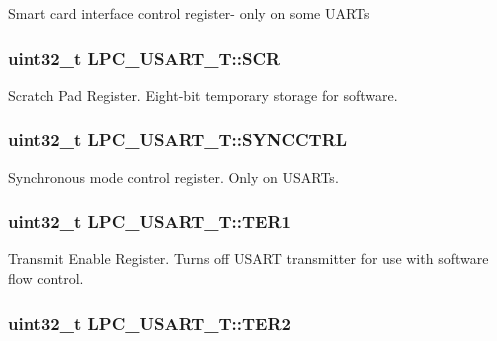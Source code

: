 Smart card interface control register-\/ only on some U\-A\-R\-Ts \hypertarget{structLPC__USART__T_a28417e4b3d19fcbb6c6ef116376ed58b}{
\subsubsection[{S\-C\-R}]{ uint32\-\_\-t L\-P\-C\-\_\-\-U\-S\-A\-R\-T\-\_\-\-T\-::\-S\-C\-R}}\label{structLPC__USART__T_a28417e4b3d19fcbb6c6ef116376ed58b}
Scratch Pad Register. Eight-\/bit temporary storage for software. \hypertarget{structLPC__USART__T_a799433e27ab7a1b61ba215ff1766a3e0}{
\subsubsection[{S\-Y\-N\-C\-C\-T\-R\-L}]{ uint32\-\_\-t L\-P\-C\-\_\-\-U\-S\-A\-R\-T\-\_\-\-T\-::\-S\-Y\-N\-C\-C\-T\-R\-L}}\label{structLPC__USART__T_a799433e27ab7a1b61ba215ff1766a3e0}
Synchronous mode control register. Only on U\-S\-A\-R\-Ts. \hypertarget{structLPC__USART__T_afa3989925f4b5c3edd74531748ccccb2}{
\subsubsection[{T\-E\-R1}]{ uint32\-\_\-t L\-P\-C\-\_\-\-U\-S\-A\-R\-T\-\_\-\-T\-::\-T\-E\-R1}}\label{structLPC__USART__T_afa3989925f4b5c3edd74531748ccccb2}
Transmit Enable Register. Turns off U\-S\-A\-R\-T transmitter for use with software flow control. \hypertarget{structLPC__USART__T_afc422e0333356dc62b23d404bfdbd1de}{
\subsubsection[{T\-E\-R2}]{ uint32\-\_\-t L\-P\-C\-\_\-\-U\-S\-A\-R\-T\-\_\-\-T\-::\-T\-E\-R2}}\label{structLPC__USART__T_afc422e0333356dc62b23d404bfdbd1de}
